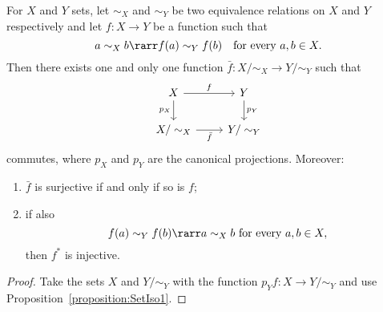 \begin{corollary}\label{corollary:SetIso2}
For \(X\) and \(Y\) sets, let \(\sim_X\) and \(\sim_Y\) be two equivalence relations on \(X\) and \(Y\) respectively and let \(f : X \to Y\) be a function such that
\[a \sim_X b \rarr f(a) \sim_Y f(b) \quad\text{for every } a, b \in X .\]
Then there exists one and only one function \(\bar f : X/\sim_X \to Y/\sim_Y\) such that
\[\begin{tikzcd}
X \ar["{p_X}", d, swap] \ar["f", r] & Y \ar["{p_Y}", d] \\
X/\sim_X \ar["{\bar f}", r, swap]   & Y/\sim_Y
\end{tikzcd}\]
commutes, where \(p_X\) and \(p_Y\) are the canonical projections. Moreover:
\begin{enumerate}
\item \(\bar f\) is surjective if and only if so is \(f\);
\item if also
\[f(a) \sim_Y f(b) \rarr a \sim_X b \text{ for every } a, b \in X ,\]
then \(f^\ast\) is injective.
\end{enumerate}
\end{corollary}

\begin{proof}
Take the sets \(X\) and \(Y/\sim_Y\) with the function \(p_Y f : X \to Y/\sim_Y\) and use Proposition~\ref{proposition:SetIso1}.
\end{proof}
